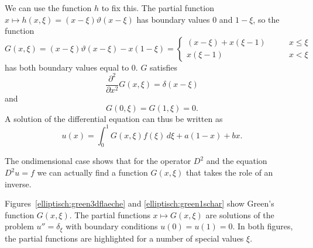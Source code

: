 We can use the function $h$ to fix this.
The partial function $x\mapsto h(x,\xi)=(x-\xi)\vartheta(x-\xi)$ has boundary
values $0$ and $1-\xi$, so the function
\[
G(x,\xi)
=
(x-\xi)\vartheta(x-\xi)-x(1-\xi)
=\begin{cases}
(x-\xi)+x(\xi-1)&\qquad x\le \xi \\
x(\xi-1)&\qquad x<\xi
\end{cases}
\]
has both boundary values equal to $0$.
$G$ satisfies
\[
\frac{\partial^2}{\partial x^2}G(x,\xi)=\delta(x-\xi)
\]
and
\[
G(0,\xi)=G(1,\xi)=0.
\]
A solution of the differential equation can thus be written as
\[
u(x)=\int_0^1G(x,\xi)f(\xi)\,d\xi+a(1-x)+bx.
\]

The ondimensional case shows that for the operator  $D^2$ and the
equation $D^2u=f$
we can actually find a function $G(x,\xi)$ that takes the role 
of an inverse.

Figures~\ref{elliptisch:green3dflaeche} and \ref{elliptisch:green1schar}
show Green's function $G(x,\xi)$.
The partial functions 
$x\mapsto G(x,\xi)$ are solutions of the problem
$u''=\delta_\xi$ with boundary conditions $u(0)=u(1)=0$.
In both figures, the partial functions are highlighted for 
a number of special values $\xi$.

